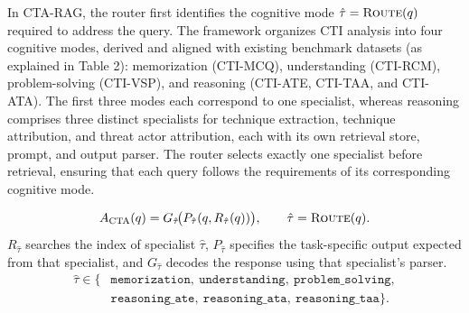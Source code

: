 \documentclass[5p,times,authoryear]{elsarticle}
\begin{document}
In CTA-RAG, the router first identifies the cognitive mode
$\hat{\tau}=\textsc{Route}(q)$ required to address the query.
The framework organizes CTI analysis into four cognitive modes, derived and aligned with existing benchmark datasets (as explained in Table 2):
memorization (CTI-MCQ), understanding (CTI-RCM), problem-solving
(CTI-VSP), and reasoning (CTI-ATE, CTI-TAA, and CTI-ATA).
The first three modes each correspond to one specialist, whereas
reasoning comprises three distinct specialists for technique
extraction, technique attribution, and threat actor attribution,
each with its own retrieval store, prompt, and output parser.
The router selects exactly one specialist before retrieval,
ensuring that each query follows the requirements of its
corresponding cognitive mode.

\begin{equation}
A_{\mathrm{CTA}}(q)=G_{\hat{\tau}}\!\bigl(P_{\hat{\tau}}(q,R_{\hat{\tau}}(q))\bigr),
\qquad
\hat{\tau}=\textsc{Route}(q).
\label{eq:cta}
\end{equation}
$R_{\hat{\tau}}$ searches the index of specialist $\hat{\tau}$,
$P_{\hat{\tau}}$ specifies the task-specific output expected from
that specialist, and $G_{\hat{\tau}}$ decodes the response using
that specialist's parser.
\begin{equation}
\begin{aligned}
\hat{\tau} \in \{&
\texttt{memorization},\
\texttt{understanding},\
\texttt{problem\_solving},\\
&
\texttt{reasoning\_ate},\
\texttt{reasoning\_ata},\
\texttt{reasoning\_taa}
\}.
\end{aligned}
\label{eq:router-space}
\end{equation}
\end{document}

